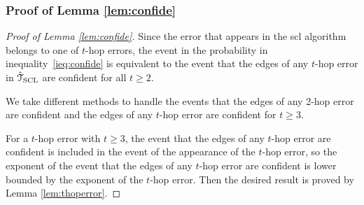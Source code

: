 \documentclass[11pt,onecolumn]{article}
\newcommand{\calT}{\mathcal{T}}
\newcommand{\hatcalT}{\hat{\calT}}
\begin{document}
\subsubsection{Proof of Lemma \ref{lem:confide}}
\begin{proof}[Proof of Lemma \ref{lem:confide}]
	Since the error that appears in the \ac{scl} algorithm belongs to one of $t$-hop errors, the event in the probability in inequality~\eqref{ieq:confide} is equivalent to the event that the edges of any $t$-hop error in $\hatcalT_{\rm{SCL}}$ are confident for all $t\geq 2$.

	We take different methods to handle the events that the edges of any 2-hop error are confident and the edges of any $t$-hop error are confident for $t\geq 3$.

	For a $t$-hop error with $t\geq 3$, the event that the edges of any $t$-hop error are confident is included in the event of the appearance of the $t$-hop error, so the exponent of the event that the edges of 
	any $t$-hop error are confident is lower bounded by the exponent of the $t$-hop error. Then the desired result is proved by Lemma \ref{lem:thoperror}.


\end{proof}
\end{document}
